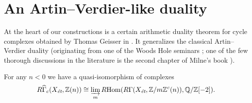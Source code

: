 
\section{An Artin--Verdier-like duality}
\label{section:artin-verdier-duality}

At the heart of our constructions is a certain arithmetic duality theorem for
cycle complexes obtained by Thomas Geisser in \cite{Geisser-10}. It generalizes
the classical Artin--Verdier duality (originating from one of the Woods Hole
seminars \cite{Artin-Verdier-64}; one of the few thorough discussions in the
literature is the second chapter of Milne's book \cite{Milne-ADT}).

\begin{proposition}
  \label{prop:an-artin-verdier}
  For any $n < 0$ we have a quasi-isomorphism of complexes
  \[ R\widehat{\Gamma}_c (X_\text{\it ét}, \mathbb{Z} (n)) \cong
    \varinjlim_m R\!\operatorname{Hom} (R\Gamma (X_\text{\it ét}, \mathbb{Z}/m\mathbb{Z}^c (n)), \mathbb{Q}/\mathbb{Z} [-2]). \]
\end{proposition}

